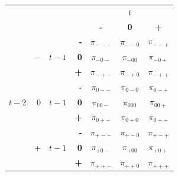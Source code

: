 \documentclass[12pt,a4paper,oneside]{book}
\begin{document}
\begin{center}
\begin{tabular}{r | r | r | r | c c c | }
 \multicolumn{3}{r}{} & \multicolumn{1}{r}{} &	\multicolumn{3}{c}{$t$} \\ \cline{5-7}
 \multicolumn{3}{r}{} & 		& \textbf{-} & \textbf{0} & \textbf{+} \\ \cline{2-2} \cline{4-7}
&&& \textbf{-} & $\pi_{---}$ & $\pi_{--0}$ & $\pi_{--+}$ \\ 
&  $-$ &$t-1$ & \textbf{0} & $\pi_{-0-}$	& $\pi_{-00}$ & $\pi_{-0+}$	\\
&&&\textbf{+} & $\pi_{-+-}$	& $\pi_{-+0}$	& $\pi_{-++}$ \\ \cline{2-2} \cline{4-7}
&&&\textbf{-} & $\pi_{0--}$	& $\pi_{0-0}$	& $\pi_{0-+}$ \\ 
$t-2$ & $0$   &$t-1$ & \textbf{0} & $\pi_{00-}$	& $\pi_{000}$	& $\pi_{00+}$	\\
&&&\textbf{+} & $\pi_{0+-}$	& $\pi_{0+0}$	& $\pi_{0++}$ \\ \cline{2-2} \cline{4-7}
&&&\textbf{-} & $\pi_{+--}$	& $\pi_{+-0}$	& $\pi_{+-+}$ \\ 
&$+$   &$t-1$ & \textbf{0} & $\pi_{+0-}$	& $\pi_{+00}$	& $\pi_{+0+}$	\\
&&&\textbf{+} & $\pi_{++-}$	& $\pi_{++0}$	& $\pi_{+++}$ \\ \cline{2-2} \cline{4-7}
		
\end{tabular}    
\end{center}
\end{document}
